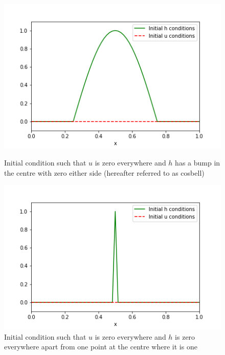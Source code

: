 \documentclass[a4paper,12pt, notitlepage]{article}
\begin{document}
\renewcommand\theContinuedFloat{\alph{ContinuedFloat}}
\begin{figure}
	\begin{minipage}{.5\textwidth}
		\ContinuedFloat*
		\captionsetup{width=0.9\textwidth}
		\captionsetup{justification=centering}
		\includegraphics[width=\textwidth]{initial_condition_cosbell.png}
		\caption{\label{initialconditioncosbell}Initial condition such that $u$ is zero everywhere and $h$ has a bump in the centre with zero either side (hereafter referred to as cosbell)} 
	\end{minipage}
	\begin{minipage}{.5\textwidth}
		\ContinuedFloat
		\captionsetup{width=0.9\textwidth}
		\captionsetup{justification=centering}
		\includegraphics[width=\textwidth]{initial_condition_spike.png}
		\caption{\label{initialconditionspike}Initial condition such that $u$ is zero everywhere and $h$ is zero everywhere apart from one point at the centre where it is one} 

\end{minipage}
\end{figure}
\end{document}
